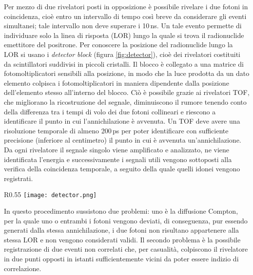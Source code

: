 \documentclass{report}
\newcommand{\figref}[1]{figura \ref{#1}}
\numberwithin{equation}{section}
\numberwithin{figure}{section}
\begin{document}
Per mezzo di due rivelatori posti in opposizione è possibile rivelare i due fotoni in coincidenza, cioè entro un intervallo di tempo così breve da considerare gli eventi simultanei; tale intervallo non deve superare i 10\,ns. Un tale evento permette di individuare solo la linea di risposta (LOR) lungo la quale si trova il radionuclide emettitore del positrone. Per conoscere la posizione del radionuclide lungo la LOR si usano i \textit{detector block} (\figref{fig:detector}), cioè dei rivelatori costituiti da scintillatori suddivisi in piccoli cristalli. Il blocco è collegato a una matrice di fotomoltiplicatori sensibili alla posizione, in modo che la luce prodotta da un dato elemento colpisca i fotomoltiplicatori in maniera dipendente dalla posizione dell'elemento stesso all'interno del blocco. Ciò è possibile grazie ai rivelatori TOF, che migliorano la ricostruzione del segnale, diminuiscono il rumore tenendo conto della differenza tra i tempi di volo dei due fotoni collineari e riescono a identificare il punto in cui l'annichilazione è avvenuta. Un TOF deve avere una risoluzione temporale di almeno 200\,ps per poter identificare con sufficiente precisione (inferiore al centimetro) il punto in cui è avvenuta un'annichilazione. Da ogni rivelatore il segnale singolo viene amplificato e analizzato, ne viene identificata l’energia e successivamente i segnali utili vengono sottoposti alla verifica della coincidenza temporale, a seguito della quale quelli idonei vengono registrati.

\begin{wrapfigure}{R}{0.55\textwidth}
    \centering
    \texttt{[image: detector.png]}
    \caption{\textit{Detector block e detector rings}.}
    \label{fig:detector}
\end{wrapfigure}

In questo procedimento sussistono due problemi: uno è la diffusione Compton, per la quale uno o entrambi i fotoni vengono deviati, di conseguenza, pur essendo generati dalla stessa annichilazione, i due fotoni non risultano appartenere alla stessa LOR e non vengono considerati validi. Il secondo problema è la possibile registrazione di due eventi non correlati che, per casualità, colpiscono il rivelatore in due punti opposti in istanti sufficientemente vicini da poter essere indizio di correlazione.

\begin{comment}
\begin{figure}[htp]
    \centering
    \texttt{[image: detector.png]}
    \caption{\label{fig:detector} \textit{Detector block e detector rings}.}
\end{figure}
\end{comment}
\end{document}
